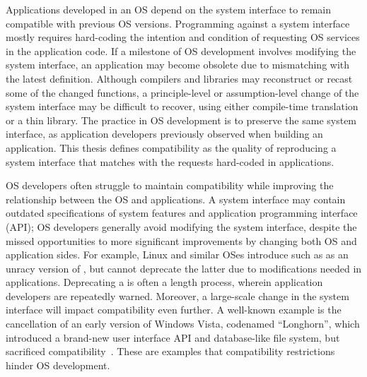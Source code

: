 



Applications developed in an OS depend on the system interface
to remain compatible with previous OS versions.
Programming against a system interface mostly requires
hard-coding the intention and condition of requesting OS services
in the application code.
If a milestone of OS development involves modifying the system interface,
an application may become obsolete
due to mismatching with the latest definition.
Although compilers and libraries may reconstruct or recast some of the changed functions,
a principle-level or assumption-level change of the system interface
may be difficult to recover,
using either compile-time translation or a thin library.
The practice in OS development is to preserve
the same system interface,
as application developers previously observed when building an application.
This thesis
defines compatibility as
the quality of reproducing a system interface that matches with the requests hard-coded in applications.



OS developers often struggle to maintain compatibility while improving
the relationship between the OS and applications.
A system interface may contain outdated specifications of system features and application programming interface (API);
OS developers generally avoid modifying the system interface,
despite the missed opportunities to
more significant improvements by changing both OS and application sides.
For example, Linux and similar OSes
introduce \linuxapis{} such as  as an unracy version
of , but cannot deprecate the latter due to modifications needed in applications.
Deprecating a \linuxapi{} is often a length process, wherein application developers are repeatedly warned.
Moreover, a large-scale change in the system interface
will impact compatibility even further.
A well-known example is the cancellation of an early version of Windows Vista, 
codenamed ``Longhorn'',
which introduced a brand-new user interface API
and database-like file system, but sacrificed compatibility~\cite{spolsky04microsoft-api-war}.
These are examples that compatibility restrictions
hinder OS development.




